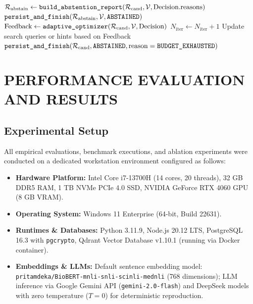 \documentclass[12pt,a4paper]{report}
\begin{document}
\begin{algorithm}[H]
\begin{algorithmic}[1]
        \State $\mathcal{R}_{\text{abstain}} \gets \text{\texttt{build\_abstention\_report}}(\mathcal{R}_{\text{cand}}, \mathcal{V}, \text{Decision.reasons})$
        \State \Return $\text{\texttt{persist\_and\_finish}}(\mathcal{R}_{\text{abstain}}, \mathcal{V}, \text{\texttt{ABSTAINED}})$
        \State $\text{Feedback} \gets \text{\texttt{adaptive\_optimizer}}(\mathcal{R}_{\text{cand}}, \mathcal{V}, \text{Decision})$
        \State $N_{\text{iter}} \gets N_{\text{iter}} + 1$
        \State Update search queries or hints based on Feedback
    \EndIf
\EndWhile
\State \Return $\text{\texttt{persist\_and\_finish}}(\mathcal{R}_{\text{cand}}, \text{\texttt{ABSTAINED}}, \text{reason} = \text{\texttt{BUDGET\_EXHAUSTED}})$
\end{algorithmic}
\end{algorithm}

\chapter{PERFORMANCE EVALUATION AND RESULTS}

\section{Experimental Setup}
All empirical evaluations, benchmark executions, and ablation experiments were conducted on a dedicated workstation environment configured as follows:
\begin{itemize}
    \item \textbf{Hardware Platform:} Intel Core i7-13700H (14 cores, 20 threads), 32 GB DDR5 RAM, 1 TB NVMe PCIe 4.0 SSD, NVIDIA GeForce RTX 4060 GPU (8 GB VRAM).
    \item \textbf{Operating System:} Windows 11 Enterprise (64-bit, Build 22631).
    \item \textbf{Runtimes \& Databases:} Python 3.11.9, Node.js 20.12 LTS, PostgreSQL 16.3 with \texttt{pgcrypto}, Qdrant Vector Database v1.10.1 (running via Docker container).
    \item \textbf{Embeddings \& LLMs:} Default sentence embedding model: \texttt{pritamdeka/BioBERT-mnli-snli-scinli-mednli} (768 dimensions); LLM inference via Google Gemini API (\texttt{gemini-2.0-flash}) and DeepSeek models with zero temperature ($T=0$) for deterministic reproduction.
\end{itemize}
\end{document}
